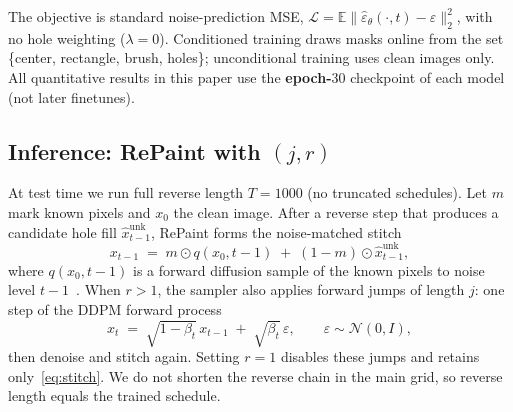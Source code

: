 The objective is standard noise-prediction MSE,
$\mathcal{L}{=}\mathbb{E}\|\hat{\varepsilon}_\theta(\cdot,t)-\varepsilon\|_2^2$,
with no hole weighting ($\lambda{=}0$).
Conditioned training draws masks online from the set \{\textrm{center}, \textrm{rectangle}, \textrm{brush}, \textrm{holes}\};
unconditional training uses clean images only.
All quantitative results in this paper use the \textbf{epoch-$30$} checkpoint of each model (not later finetunes).

\subsection{Inference: RePaint with $(j,r)$}
\label{sec:inference}
At test time we run full reverse length $T{=}1000$ (no truncated schedules).
Let $m$ mark known pixels and $x_0$ the clean image.
After a reverse step that produces a candidate hole fill $\hat{x}_{t-1}^{\mathrm{unk}}$, RePaint forms the noise-matched stitch
\begin{equation}
  x_{t-1}
  \;=\;
  m\odot q(x_0,t{-}1)
  \;+\;
  (1-m)\odot \hat{x}_{t-1}^{\mathrm{unk}},
  \label{eq:stitch}
\end{equation}
where $q(x_0,t{-}1)$ is a forward diffusion sample of the known pixels to noise level $t{-}1$~\citep{lugmayr2022repaint}.
When $r{>}1$, the sampler also applies forward jumps of length $j$: one step of the DDPM forward process
\begin{equation}
  x_{t}
  \;=\;
  \sqrt{1-\beta_{t}}\,x_{t-1}
  \;+\;
  \sqrt{\beta_{t}}\,\varepsilon,
  \qquad \varepsilon\sim\mathcal{N}(0,I),
  \label{eq:jump}
\end{equation}
then denoise and stitch again.
Setting $r{=}1$ disables these jumps and retains only~\eqref{eq:stitch}.
We do not shorten the reverse chain in the main grid, so reverse length equals the trained schedule.

